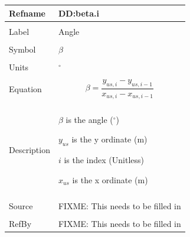 \documentclass[12pt]{article}
\begin{document}
\noindent \begin{minipage}{\textwidth}
\begin{tabular}{p{} p{}}
\toprule \textbf{Refname} & \textbf{DD:beta.i}
\label{DD:beta.i}
\\ \midrule \\
Label & Angle
\\ \midrule \\
Symbol & $β$
\\ \midrule \\
Units & ${}^{\circ}$
\\ \midrule \\
Equation & \begin{dmath}
           β=\frac{{y_{us,i}}-{y_{us,i-1}}}{{x_{us,i}}-{x_{us,i-1}}}
           \end{dmath}
\\ \midrule \\
Description & \begin{symbDescription}
              \item{$β$ is the angle (${}^{\circ}$)}
              \item{${y_{us}}$ is the y ordinate (m)}
              \item{$i$ is the index (Unitless)}
              \item{${x_{us}}$ is the x ordinate (m)}
              \end{symbDescription}
\\ \midrule \\
Source & FIXME: This needs to be filled in
\\ \midrule \\
RefBy & FIXME: This needs to be filled in
\\ \bottomrule \end{tabular}
\end{minipage}\\
~\newline
\end{document}
